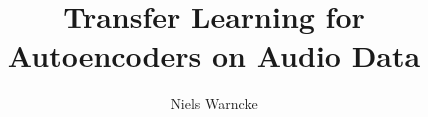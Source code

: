 \documentclass[12pt]{gatechthesis}
\title{Transfer Learning for Autoencoders on Audio Data}
\author{Niels Warncke}
\begin{document}
%

\begin{frontmatter}
    
    
    
    \makeTOC
    \makeListOfTables
    \makeListOfFigures
\end{frontmatter}


\begin{thesisbody}
    
    
    
    
    
    \makeBibliography
\end{thesisbody}
\end{document}
